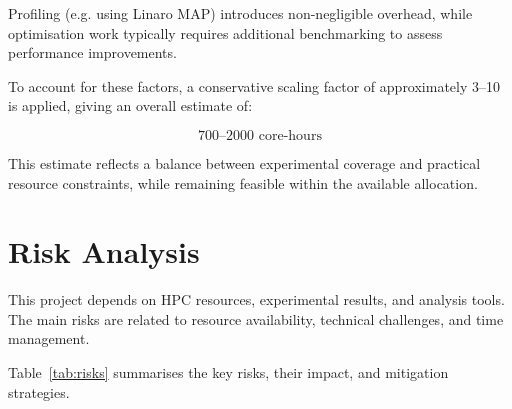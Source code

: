 \documentclass{article}
\begin{document}
Profiling (e.g. using Linaro MAP) introduces non-negligible overhead, while optimisation work typically requires additional benchmarking to assess performance improvements.

To account for these factors, a conservative scaling factor of approximately 3--10 is applied, giving an overall estimate of:

\[
700\text{--}2000 \text{ core-hours}
\]

This estimate reflects a balance between experimental coverage and practical resource constraints, while remaining feasible within the available allocation.

\section{Risk Analysis}

This project depends on HPC resources, experimental results, and analysis tools. 
The main risks are related to resource availability, technical challenges, and time management.

Table~\ref{tab:risks} summarises the key risks, their impact, and mitigation strategies.
\end{document}
